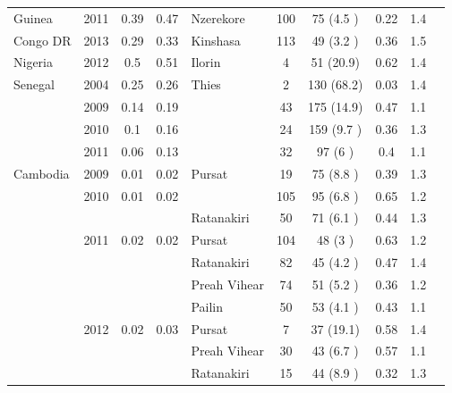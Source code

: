 \documentclass[9pt,lineno]{elife}
\begin{document}
\begin{table}[btp]
{\begin{tabular}{p{1.4cm} c c c |p{1.7cm} c c c c p{2.7cm}}
\cline{1-9}
Guinea                 &2011           &0.39  &0.47  &Nzerekore&100  &75   (4.5 )&0.22 &1.4  &\\
\cline{1-9}
Congo DR        &2013           &0.29  &0.33  &Kinshasa&113  &49   (3.2 )&0.36 &1.5  &\\
\cline{1-9}
Nigeria         &2012           &0.5   &0.51  &Ilorin&4    &51   (20.9)&0.62 &1.4  &\\
\hline
Senegal         &2004           &0.25  &0.26  &Thies&2    &130  (68.2)&0.03 &1.4  &\citet{Wong2017}\\
                &2009           &0.14  &0.19  &               &43   &175  (14.9)&0.47 &1.1  &\\
                &2010           &0.1   &0.16  &               &24   &159  (9.7 )&0.36 &1.3  &\\
                &2011           &0.06  &0.13  &               &32   &97   (6   )&0.4  &1.1  &\\
\hline
\hline
Cambodia        &2009           &0.01  &0.02  &Pursat&19   &75   (8.8 )&0.39 &1.3  &\multirow{3}{*}{\parbox{3.4cm}{\citet{Amato2017, eLife2016}}}\\
                &2010           &0.01  &0.02  &               &105  &95   (6.8 )&0.65 &1.2  &\\
                &               &               &               &Ratanakiri&50   &71   (6.1 )&0.44 &1.3  &\\
                &2011           &0.02  &0.02  &Pursat&104  &48   (3   )&0.63 &1.2  &\\
                &               &               &               &Ratanakiri&82   &45   (4.2 )&0.47 &1.4  &\\
                &               &               &               &Preah Vihear&74   &51   (5.2 )&0.36 &1.2  &\\
                &               &               &               &Pailin&50   &53   (4.1 )&0.43 &1.1  &\\
                &2012           &0.02  &0.03  &Pursat&7    &37   (19.1)&0.58 &1.4  &\\
                &               &               &               &Preah Vihear&30   &43   (6.7 )&0.57 &1.1  &\\
                &               &               &               &Ratanakiri&15   &44   (8.9 )&0.32 &1.3  &\\

\end{tabular}}
\end{table}
\end{document}

